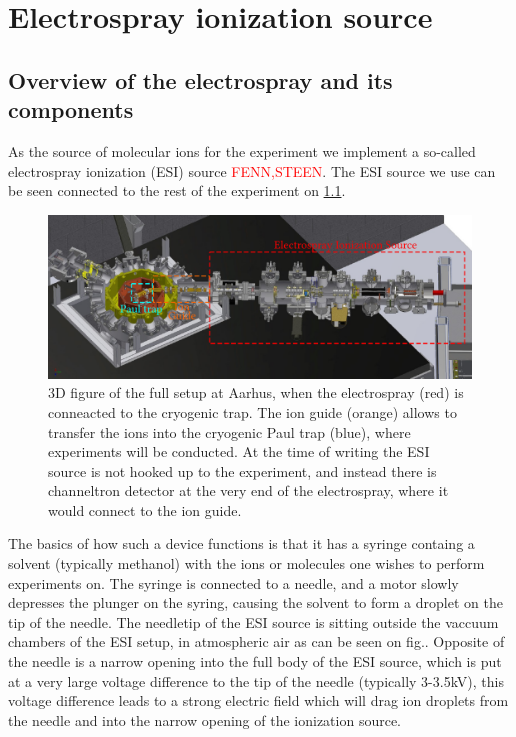 \chapter{Electrospray ionization source}
\label{chap:ESI}

\section{Overview of the electrospray and its components}
As the source of molecular ions for the experiment we implement a so-called electrospray ionization (ESI) source \textcolor{red}{FENN,STEEN}. The ESI source we use can be seen connected to the rest of the experiment on \cref{fig:fullSetup}.
\begin{figure}
    \centering
    \includegraphics[width = 1.1\textwidth]{main/spray.pdf}
    \caption{3D figure of the full setup at Aarhus, when the electrospray (red) is conneacted to the cryogenic trap. The ion guide (orange) allows to transfer the ions into the cryogenic Paul trap (blue), where experiments will be conducted. At the time of writing the ESI source is not hooked up to the experiment, and instead there is channeltron detector at the very end of the electrospray, where it would connect to the ion guide.}
    \label{fig:fullSetup}
\end{figure}
The basics of how such a device functions is that it has a syringe containg a solvent (typically methanol) with the ions or molecules one wishes to perform experiments on. The syringe is connected to a needle, and a motor slowly depresses the plunger on the syring, causing the solvent to form a droplet on the tip of the needle. The needletip of the ESI source is sitting outside the vaccuum chambers of the ESI setup, in atmospheric air as can be seen on fig..
Opposite of the needle is a narrow opening into the full body of the ESI source, which is put at a very large voltage difference to the tip of the needle (typically 3-3.5kV), this voltage difference leads to a strong electric field which will drag ion droplets from the needle and into the narrow opening of the ionization source.
